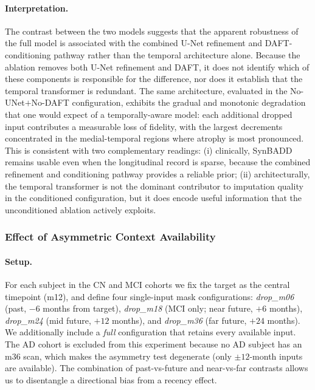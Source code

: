 \paragraph{Interpretation.} The contrast between the two models suggests that the apparent robustness of the full model is associated with the combined U-Net refinement and DAFT-conditioning pathway rather than the temporal architecture alone. Because the ablation removes both U-Net refinement and DAFT, it does not identify which of these components is responsible for the difference, nor does it establish that the temporal transformer is redundant. The same architecture, evaluated in the No-UNet$+$No-DAFT configuration, exhibits the gradual and monotonic degradation that one would expect of a temporally-aware model: each additional dropped input contributes a measurable loss of fidelity, with the largest decrements concentrated in the medial-temporal regions where atrophy is most pronounced. This is consistent with two complementary readings: (i) clinically, SynBADD remains usable even when the longitudinal record is sparse, because the combined refinement and conditioning pathway provides a reliable prior; (ii) architecturally, the temporal transformer is not the dominant contributor to imputation quality in the conditioned configuration, but it does encode useful information that the unconditioned ablation actively exploits.

\subsubsection{Effect of Asymmetric Context Availability}
\label{sec:asymmetry}

\paragraph{Setup.} For each subject in the CN and MCI cohorts we fix the target as the central timepoint (m12), and define four single-input mask configurations: \textit{drop\_m06} (past, $-6$ months from target), \textit{drop\_m18} (MCI only; near future, $+6$ months), \textit{drop\_m24} (mid future, $+12$ months), and \textit{drop\_m36} (far future, $+24$ months). We additionally include a \textit{full} configuration that retains every available input. The AD cohort is excluded from this experiment because no AD subject has an m36 scan, which makes the asymmetry test degenerate (only $\pm 12$-month inputs are available). The combination of past-vs-future and near-vs-far contrasts allows us to disentangle a directional bias from a recency effect.

